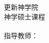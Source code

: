 \makeatletter
\begin{titlepage}
  \begin{center}
    更新神学院
    \\[7cm]
    \@title
    \vfill
    神学硕士课程
    \\\classname
    \\指导教师：\teacher
    \\[3cm]
    \@author
    \\\@date
  \end{center}
\end{titlepage}
\makeatother